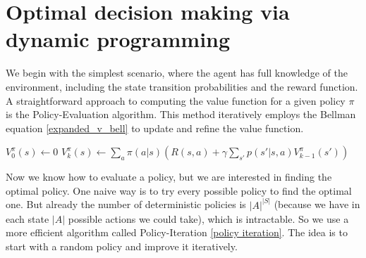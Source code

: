 \section{Optimal decision making via dynamic programming}\label{dynammic programming}
We begin with the simplest scenario, where the agent has full knowledge of the environment, 
including the state transition probabilities and the reward function. A straightforward approach 
to computing the value function for a given policy $\pi$ is the Policy-Evaluation algorithm. 
This method iteratively employs the Bellman equation \eqref{expanded_v_bell} to update and refine the value function.
\begin{algorithm}[H]
   \large
    \caption{Policy Evaluation}\label{policy evaluation}
    \begin{algorithmic}
        \STATE  $V_0^{\pi}(s) \gets 0 $
                \STATE $ V_k^{\pi}(s) \gets  \sum_a \pi(a|s)\left(R(s,a)+\gamma \sum_{s'} p(s'|s,a)V_{k-1}^{\pi}(s')\right) $
            \ENDFOR
        \ENDFOR
    \end{algorithmic}
\end{algorithm}
Now we know how to evaluate a policy, but we are interested in finding 
the optimal policy. One naive way is to try every possible policy to find the 
optimal one. But already the number of deterministic policies is $|A|^{|S|}$ 
(because we have in each state $|A|$ possible actions we could take), which is 
intractable. So we use a more efficient algorithm called Policy-Iteration
\eqref{policy iteration}. The idea is to start with a random policy and 
improve it iteratively. 

